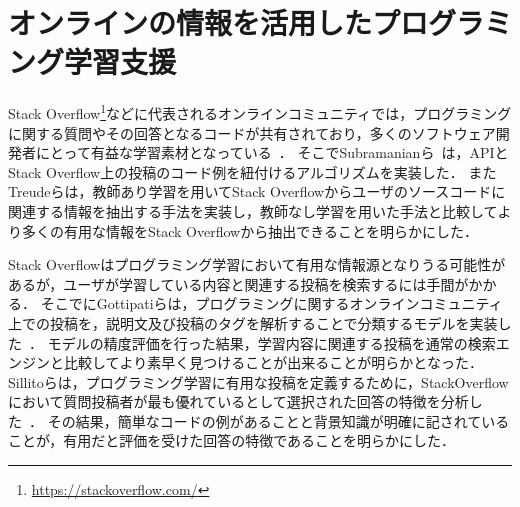 \section{オンラインの情報を活用したプログラミング学習支援}


%
%

Stack Overflow\footnote{\url{https://stackoverflow.com/}}などに代表されるオンラインコミュニティでは，プログラミングに関する質問やその回答となるコードが共有されており，多くのソフトウェア開発者にとって有益な学習素材となっている~\cite{Mamykina_Design_SO}．
そこでSubramanianら~\cite{Live_in_Documentation}は，APIとStack Overflow上の投稿のコード例を紐付けるアルゴリズムを実装した．
またTreudeら\cite{Augmenting_API_Documentation}は，教師あり学習を用いてStack Overflowからユーザのソースコードに関連する情報を抽出する手法を実装し，教師なし学習を用いた手法と比較してより多くの有用な情報をStack Overflowから抽出できることを明らかにした．

Stack Overflowはプログラミング学習において有用な情報源となりうる可能性があるが，ユーザが学習している内容と関連する投稿を検索するには手間がかかる．
そこでにGottipatiらは，プログラミングに関するオンラインコミュニティ上での投稿を，説明文及び投稿のタグを解析することで分類するモデルを実装した~\cite{Gottipati_finding_resource}．
モデルの精度評価を行った結果，学習内容に関連する投稿を通常の検索エンジンと比較してより素早く見つけることが出来ることが明らかとなった．
Sillitoらは，プログラミング学習に有用な投稿を定義するために，StackOverflowにおいて質問投稿者が最も優れているとして選択された回答の特徴を分析した~\cite{StackOverflowCodeExample}．
その結果，簡単なコードの例があることと背景知識が明確に記されていることが，有用だと評価を受けた回答の特徴であることを明らかにした．




